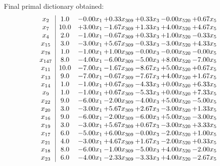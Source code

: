 \documentclass[8pt]{article}
\begin{document}
 Final primal dictionary obtained: 
\[\begin{array}{c| c c@{\hskip 2pt} c@{\hskip 2pt} c@{\hskip 2pt} c@{\hskip 2pt} c@{\hskip 2pt} }
 x_{2}   &  1.0 & -0.00 x_{1} & +  0.33 x_{309} & +  0.33 x_{3} & -0.00 x_{520} & +  0.67 x_{5}\\
 x_{7}   &  10.0 & +  3.00 x_{1} & -1.67 x_{309} & +  1.33 x_{3} & +  4.00 x_{520} & +  4.67 x_{5}\\
 x_{4}   &  2.0 & -1.00 x_{1} & -0.67 x_{309} & +  0.33 x_{3} & +  1.00 x_{520} & -0.33 x_{5}\\
 x_{15}   &  3.0 & -3.00 x_{1} & +  5.67 x_{309} & -0.33 x_{3} & -3.00 x_{520} & +  4.33 x_{5}\\
 x_{78}   &  1.0 & -1.00 x_{1} & +  1.00 x_{309} & -0.00 x_{3} & -0.00 x_{520} & -0.00 x_{5}\\
 x_{147}   &  8.0 & -4.00 x_{1} & -6.00 x_{309} & -5.00 x_{3} & +  8.00 x_{520} & -7.00 x_{5}\\
 x_{11}   &  10.0 & -7.00 x_{1} & -1.67 x_{309} & -8.67 x_{3} & +  5.00 x_{520} & +  0.67 x_{5}\\
 x_{13}   &  9.0 & -7.00 x_{1} & -0.67 x_{309} & -7.67 x_{3} & +  4.00 x_{520} & +  1.67 x_{5}\\
 x_{14}   &  1.0 & -1.00 x_{1} & +  0.67 x_{309} & -4.33 x_{3} & +  0.00 x_{520} & +  6.33 x_{5}\\
 x_{9}   &  1.0 & -1.00 x_{1} & +  0.67 x_{309} & -5.33 x_{3} & +  0.00 x_{520} & +  7.33 x_{5}\\
 x_{22}   &  9.0 & -6.00 x_{1} & -2.00 x_{309} & -4.00 x_{3} & +  5.00 x_{520} & -5.00 x_{5}\\
 x_{20}   &  3.0 & -3.00 x_{1} & +  5.67 x_{309} & +  2.67 x_{3} & -3.00 x_{520} & +  1.33 x_{5}\\
 x_{16}   &  9.0 & -6.00 x_{1} & -2.00 x_{309} & -6.00 x_{3} & +  5.00 x_{520} & -3.00 x_{5}\\
 x_{19}   &  3.0 & -3.00 x_{1} & +  5.67 x_{309} & +  0.67 x_{3} & -3.00 x_{520} & +  3.33 x_{5}\\
 x_{17}   &  6.0 & -5.00 x_{1} & +  6.00 x_{309} & -0.00 x_{3} & -2.00 x_{520} & +  1.00 x_{5}\\
 x_{21}   &  4.0 & -3.00 x_{1} & +  4.67 x_{309} & +  1.67 x_{3} & -2.00 x_{520} & +  0.33 x_{5}\\
 x_{18}   &  8.0 & -6.00 x_{1} & -1.00 x_{309} & -5.00 x_{3} & +  4.00 x_{520} & -2.00 x_{5}\\
 x_{23}   &  6.0 & -4.00 x_{1} & -2.33 x_{309} & -3.33 x_{3} & +  4.00 x_{520} & -2.67 x_{5}\\

\end{array}\]
\end{document}
